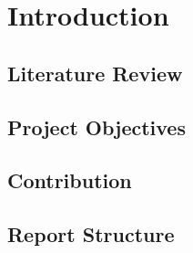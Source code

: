 \chapter{Introduction}



\cite{Langen:Thesis:2016}
\cite{skolnik}






\section{Literature Review}

\section{Project Objectives}

\section{Contribution}

\section{Report Structure}